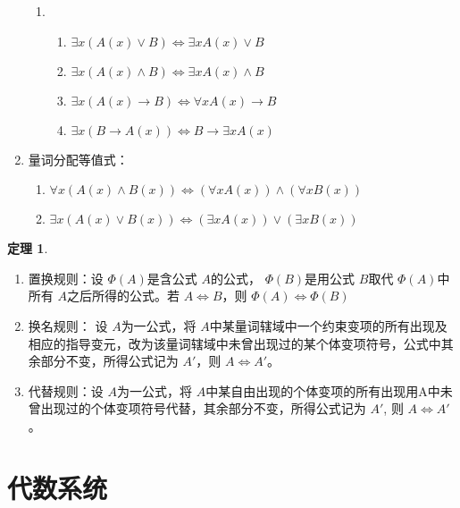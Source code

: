 \documentclass[a4paper,11pt]{article}%
\theoremstyle{remark}
\theoremstyle{remark}
\theoremstyle{definition}
\newtheorem{theorem}{定理}[section]
\theoremstyle{definition}
\theoremstyle{plain}
\begin{document}
\begin{enumerate}
\begin{enumerate}
    \item \begin{enumerate}
        \item $\exists x(A(x)\lor B)\Leftrightarrow\exists x A(x)\lor B$
        \item $\exists x(A(x)\land B)\Leftrightarrow\exists x A(x)\land B$
        \item  $\exists x (A(x)\rightarrow B)\Leftrightarrow\forall xA(x)\rightarrow B$
        \item  $\exists x(B\rightarrow A(x))\Leftrightarrow B\rightarrow \exists xA(x)$
    \end{enumerate}
    \end{enumerate}
    \item 量词分配等值式：
    \begin{enumerate}
        \item $\forall x(A(x)\land B(x))\Leftrightarrow(\forall xA(x))\land(\forall xB(x))$
        \item $\exists x(A(x)\lor B(x))\Leftrightarrow(\exists xA(x))\lor(\exists xB(x))$
    \end{enumerate}
\end{enumerate}
\begin{theorem}
    \begin{enumerate}
        \item 置换规则：设 $\Phi(A)$是含公式 $A$的公式， $\Phi(B)$是用公式 $B$取代 $\Phi(A)$中所有 $A$之后所得的公式。若 $A\Leftrightarrow B$，则 $\Phi(A)\Leftrightarrow\Phi(B)$
        \item 换名规则： 设 $A$为一公式，将 $A$中某量词辖域中一个约束变项的所有出现及相应的指导变元，改为该量词辖域中未曾出现过的某个体变项符号，公式中其余部分不变，所得公式记为 $A'$，则 $A\Leftrightarrow A'$。
        \item 代替规则：设 $A$为一公式，将 $A$中某自由出现的个体变项的所有出现用A中未曾出现过的个体变项符号代替，其余部分不变，所得公式记为 $A'$, 则 $A\Leftrightarrow A'$。
    \end{enumerate}
\end{theorem}
\section{代数系统}
\end{document}
